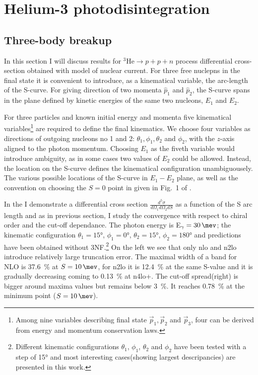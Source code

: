 \clearpage

\section{Helium-3 photodisintegration}
\label{sec:hel_results}

\subsection{Three-body breakup}
\label{sec:hel_3N}

    In this section I will discuss results
    for $^3\text{He} \rightarrow p + p + n$ process differential
    cross-section obtained with  model of nuclear current.
    For three free nuclepns in the final state it is convenient to
    introduce, as a kinematical variable, the arc-length of the S-curve.
    For giving direction of two momenta $\hat{p}_1$ and $\hat{p}_2$,
    the S-curve spans in the plane defined by kinetic energies of the 
    same two nucleons, $E_1$ and $E_2$.

    For three particles and known initial energy and momenta five kinematical
    variables\footnote{Among nine variables describing final state 
    $\vec{p}_1,\vec{p}_2$ and $\vec{p}_3$, four can be derived from 
    energy and momentum conservation laws.}
    are required to define the final kinematics.
    We choose four variables as directions of outgoing nucleons no 1 and 2:
    $\theta_1, \phi_1, \theta_2$ and $\phi_2$, with the $z$-axis aligned to the 
    photon momentum. Choosing $E_1$ as the fiveth variable would introduce
    ambiguity, as in some cases two values of $E_2$ could be allowed.
    Instead, the location on the S-curve defines the kinematical configuration
    unambiguousely.
    The various possible locations of the S-curve in $E_1-E_2$ plane,
    as well as the convention on choosing the $S=0$ point in given
    in Fig.~1 of \cite{GLOCKLE_report_1996}.
    
    In the  I demonstrate a differential cross section 
    $\frac{d^5\sigma}{d\Omega_1d\Omega_2dS}$ as a function of the S arc length
    and as in previous section, I study the convergence with respect to chiral
    order and the cut-off dependance.
    The photon energy is  E$_\gamma=\SI{30}{\mev}$; the kinematic configuration
    $\theta_1 = \ang{15}$, $\phi_1 = \ang{0}$,
    $\theta_2 = \ang{15}$, $\phi_2 = \ang{180}$ and predictions have been
    obtained without 3NF.\footnote{Different kinematic configurations $\theta_1$, $\phi_1$,
    $\theta_2$ and $\phi_2$ have been tested with a step of \ang{15}
    and most interesting cases(showing largest descripancies) are presented in this work.}
    On the left we see that only \gls{nlo} and \gls{n2lo} introduce relatively large truncation error.
    The maximal width of a band for NLO is \SI{37.6}{\percent} at $S=\SI{10}{\mev}$,
    for \gls{n2lo} it is \SI{12.4}{\percent} at the same S-value and it is gradually decreasing
    coming to \SI{0.13}{\percent} at \gls{n4lo+}.
    The cut-off spread(right) is bigger around maxima values but remains below
    \SI{3}{\percent}. It reaches
    \SI{0.78}{\percent} at the minimum point ($S=\SI{10}{\mev}$).
    

